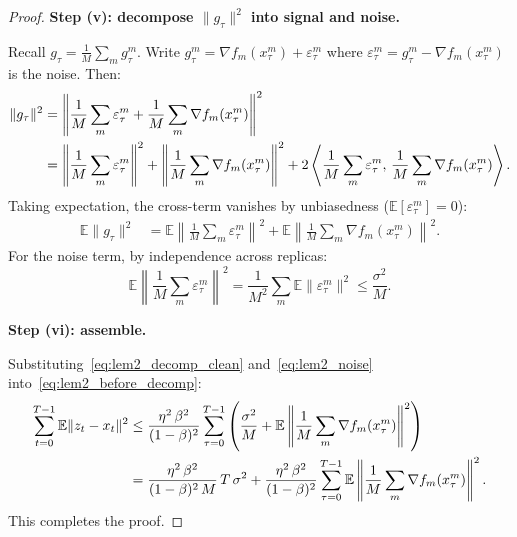 \documentclass{article}
\begin{document}
\begin{proof}
\medskip
\noindent\textbf{Step (v): decompose $\|g_\tau\|^2$ into signal and noise.}

Recall $g_\tau = \frac{1}{M}\sum_m g_\tau^m$. Write
$g_\tau^m = \nabla f_m(x_\tau^m) + \varepsilon_\tau^m$ where
$\varepsilon_\tau^m = g_\tau^m - \nabla f_m(x_\tau^m)$ is the noise. Then:
\begin{align}
\|g_\tau\|^2
&= \left\|\frac{1}{M}\sum_m \varepsilon_\tau^m
   + \frac{1}{M}\sum_m \nabla f_m(x_\tau^m)\right\|^2 \notag \\
&= \left\|\frac{1}{M}\sum_m \varepsilon_\tau^m\right\|^2
   + \left\|\frac{1}{M}\sum_m \nabla f_m(x_\tau^m)\right\|^2
   + 2\left\langle \frac{1}{M}\sum_m \varepsilon_\tau^m,\,
   \frac{1}{M}\sum_m \nabla f_m(x_\tau^m)\right\rangle.
\label{eq:lem2_decomp_raw}
\end{align}
Taking expectation, the cross-term vanishes by unbiasedness
($\mathbb{E}[\varepsilon_\tau^m] = 0$):
\begin{align}
\mathbb{E}\|g_\tau\|^2
&= \mathbb{E}\left\|\frac{1}{M}\sum_m \varepsilon_\tau^m\right\|^2
   + \mathbb{E}\left\|\frac{1}{M}\sum_m
   \nabla f_m(x_\tau^m)\right\|^2.
\label{eq:lem2_decomp_clean}
\end{align}
For the noise term, by independence across replicas:
\begin{equation}
\mathbb{E}\left\|\frac{1}{M}\sum_m \varepsilon_\tau^m\right\|^2
= \frac{1}{M^2}\sum_m \mathbb{E}\|\varepsilon_\tau^m\|^2
\leq \frac{\sigma^2}{M}.
\label{eq:lem2_noise}
\end{equation}

\medskip
\noindent\textbf{Step (vi): assemble.}

Substituting~\eqref{eq:lem2_decomp_clean} and~\eqref{eq:lem2_noise}
into~\eqref{eq:lem2_before_decomp}:
\begin{align}
\sum_{t=0}^{T-1}\mathbb{E}\|z_t - x_t\|^2
&\leq \frac{\eta^2\,\beta^2}{(1-\beta)^2}\sum_{\tau=0}^{T-1}
\left(\frac{\sigma^2}{M}
+ \mathbb{E}\left\|\frac{1}{M}\sum_m
\nabla f_m(x_\tau^m)\right\|^2\right) \notag \\
&= \frac{\eta^2\,\beta^2}{(1-\beta)^2\,M}\,T\,\sigma^2
+ \frac{\eta^2\,\beta^2}{(1-\beta)^2}\sum_{\tau=0}^{T-1}
\mathbb{E}\left\|\frac{1}{M}\sum_m
\nabla f_m(x_\tau^m)\right\|^2.
\label{eq:lem2_done}
\end{align}
This completes the proof.
\end{proof}
\end{document}
